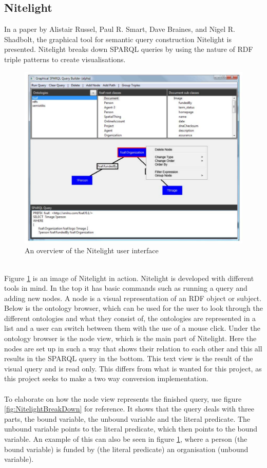 \subsection{Nitelight}
In a paper by Alistair Russel, Paul R. Smart, Dave Braines, and Nigel R. Shadbolt\cite{Nitelight}, the graphical tool for semantic query construction Nitelight is presented. Nitelight breaks down SPARQL queries  by using the nature of RDF triple patterns to create visualisations. 
\begin{figure}[H]
    \centering
  \includegraphics[width=.9\linewidth]{figures/NitelightFigure1.pdf}
  \caption{An overview of the Nitelight user interface\cite{Nitelight}}
  \label{fig:NitelightUI}
\end{figure}
\\
Figure \ref{fig:NitelightUI} is an image of Nitelight in action. Nitelight is developed with different tools in mind. In the top it has basic commands such as running a query and adding new nodes. A node is a visual representation of an RDF object or subject. Below is the ontology browser, which can be used for the user to look through the different ontologies and what they consist of, the ontologies are represented in a list and a user can switch between them with the use of a mouse click. Under the ontology browser is the node view, which is the main part of Nitelight. Here the nodes are set up in such a way that shows their relation to each other and this all results in the SPARQL query in the bottom. This text view is the result of the visual query and is read only. This differs from what is wanted for this project, as this project seeks to make a two way conversion implementation.
\\\\
To elaborate on how the node view represents the finished query, use figure \ref{fig:NitelightBreakDown} for reference. It shows that the query deals with three parts, the bound variable, the unbound variable and the literal predicate. The unbound variable points to the literal predicate, which then points to the bound variable. An example of this can also be seen in figure \ref{fig:NitelightUI}, where a person (the bound variable) is funded by (the literal predicate) an organisation (unbound variable).

